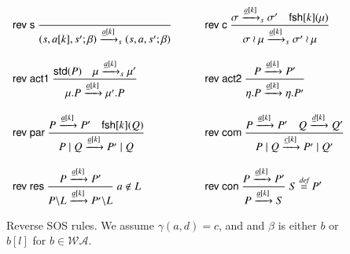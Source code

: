 {\begin{figure}[t]
\[
\begin{array}{ll}
\rulename{rev s}\ 
\Rule
{
}
{(s,a[k],s';\beta) \xrightarrow{\underline{a}[k]}_s (s,a,s';\beta)}
\qquad &
\rulename{rev c}\
\Rule
{\sigma \xrightarrow{\underline{a}[k]}_s \sigma'\quad \fresh{k}{\mu}}
{\sigma \wr \mu \xrightarrow{\underline{a}[k]}_s \sigma' \wr \mu}
\\[25pt]
%
\rulename{rev act1}\
\Rule
{\std{P} %
\quad \mu \xrightarrow{\underline{a}[k]}_s \mu' }
{\mu.P \xrightarrow{\underline{a}[k]}\mu'.P}
\quad &
%
%
%
\rulename{rev act2}\
\Rule
{P \xrightarrow{\underline{a}[k]} P' %
}
{\eta.P \xrightarrow{\underline{a}[k]} \eta.P'}
\\[25pt]
\rulename{rev par}\
\Rule
{P \xrightarrow{\underline{a}[k]} P'\quad \fresh{k}{Q}}
{P \paral Q \xrightarrow{\underline{a}[k]} P' \paral Q}
\quad &
\rulename{rev com}\
\Rule
{P \xrightarrow{\underline{a}[k]} P' \quad Q \xrightarrow{\underline{d}[k]} Q'}
{P \paral Q \xrightarrow{\underline{c}[k]} P' \paral Q'}
%
\\[25pt]
\rulename{rev res}\
\Rule
{P \xrightarrow{\underline{a}[k]} P'}
{P\backslash L \xrightarrow{\underline{a}[k]} P'\backslash L}
\; a \notin L
\quad &
\rulename{rev con}\
\Rule
{P \xrightarrow{\underline{a}[k]} P'}
{P \xrightarrow{\underline{a}[k]} S}
\; S \bydef P'
\end{array}
\]
\caption{Reverse SOS rules. We assume $\gamma(a,d)=c$, and 
and $\beta$ is either $b$ or $b[l]$ for $b \in \mathcal{WA}$. %
} 
\label{fig:reversesos}
\end{figure}

}
